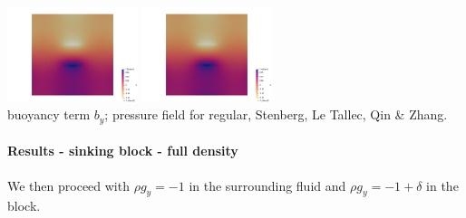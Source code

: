 \begin{center}
\includegraphics[width=3.8cm]{python_codes/fieldstone_78/results/block/reduced/p2}
\includegraphics[width=3.8cm]{python_codes/fieldstone_78/results/block/reduced/p3}\\
{\captionfont buoyancy term $b_y$; pressure field for regular, Stenberg, Le Tallec, Qin \& Zhang.} 
\end{center}


\paragraph{Results - sinking block - full density}

We then proceed with $\rho g_y=-1$ in the surrounding fluid and $\rho g_y=-1+\delta$ in the block.

